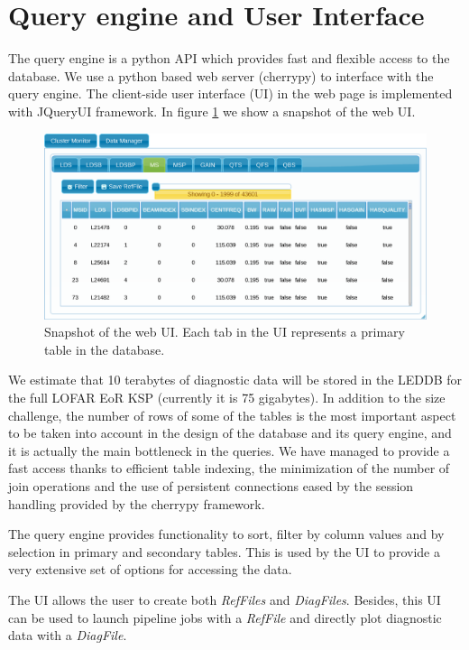 \section{Query engine and User Interface}

The query engine is a python API which provides fast and flexible access to the database.
We use a python based web server (cherrypy) to interface with the query engine. The client-side user interface (UI) in the web page is implemented with JQueryUI framework. In figure \ref{fig:webui} we show a snapshot of the web UI.
\begin{figure}[!ht]
  \centering
    \includegraphics[scale=0.24]{part10/Martinez-rubi_O23/O23_f3.eps} 
  \caption{Snapshot of the web UI. Each tab in the UI represents a primary table in the database.}
  \label{fig:webui}
\end{figure}

We estimate that 10 terabytes of diagnostic data will be stored in the LEDDB for the full LOFAR EoR KSP (currently it is 75 gigabytes). In addition to the size challenge, the number of rows of some of the tables is the most important aspect to be taken into account in the design of the database and its query engine, and it is actually the main bottleneck in the queries. We have managed to provide a fast access thanks to efficient table indexing, the minimization of the number of join operations and the use of persistent connections eased by the session handling provided by the cherrypy framework. 

The query engine provides functionality to sort, filter by column values and by selection in primary and secondary tables. This is used by the UI to provide a very extensive set of options for accessing the data.

The UI allows the user to create both \textit{RefFiles} and \textit{DiagFiles}. Besides, this UI can be used to launch pipeline jobs with a \textit{RefFile} and directly plot diagnostic data with a \textit{DiagFile}.

